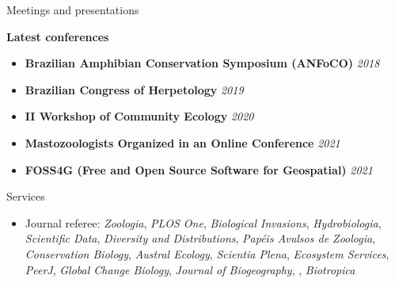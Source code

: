 \documentclass{resume}
\begin{document}
\begin{rSection}{Meetings and presentations}

{\bf Latest conferences}
\begin{itemize}
\item {\bf Brazilian Amphibian Conservation Symposium (ANFoCO)} \hfill{\em 2018}
\item {\bf Brazilian Congress of Herpetology} \hfill{\em 2019}
\item {\bf II Workshop of Community Ecology} \hfill{\em 2020}
\item {\bf Mastozoologists Organized in an Online Conference} \hfill{\em 2021}
\item {\bf FOSS4G (Free and Open Source Software for Geospatial)} \hfill{\em 2021}
\end{itemize}

\end{rSection}


\begin{rSection}{Services}
\begin{itemize}
\item Journal referee: {\it Zoologia}, {\it PLOS One}, {\it Biological Invasions}, {\it Hydrobiologia}, {\it Scientific Data}, {\it Diversity and Distributions}, {\it Papéis Avulsos de Zoologia}, {\it Conservation Biology}, {\it Austral Ecology}, {\it Scientia Plena}, {\it Ecosystem Services}, {\it PeerJ}, {\it Global Change Biology}, {\it Journal of Biogeography}, , {\it Biotropica}
\end{itemize}
\end{rSection}

\end{document}
